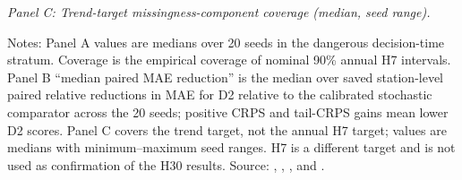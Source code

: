 \begin{table}[p]
\par\medskip
\textit{Panel C: Trend-target missingness-component coverage (median, seed range).}\par\smallskip
{}
\par\smallskip\footnotesize Notes: Panel A values are medians over 20 seeds in the dangerous decision-time stratum. Coverage is the empirical coverage of nominal 90\% annual H7 intervals. Panel B ``median paired MAE reduction'' is the median over saved station-level paired relative reductions in MAE for D2 relative to the calibrated stochastic comparator across the 20 seeds; positive CRPS and tail-CRPS gains mean lower D2 scores. Panel C covers the trend target, not the annual H7 target; values are medians with minimum--maximum seed ranges. H7 is a different target and is not used as confirmation of the H30 results. Source: , , , and .
\end{table}
